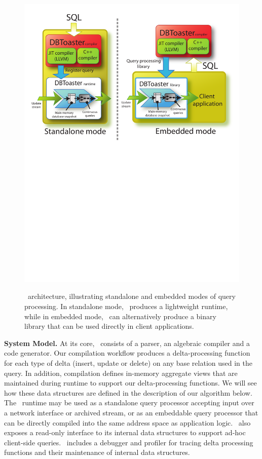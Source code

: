 \begin{figure}[tb]
\includegraphics[scale=0.42]{figures/dbt-arch.pdf}
\label{fig:dbtarch}

\vspace{-6mm}

\caption{\compiler\ architecture, illustrating standalone and embedded modes of
query processing. In standalone mode, \compiler\ produces a lightweight
runtime, while in embedded mode, \compiler\ can alternatively produce a binary
library that can be used directly in client applications.}

\vspace{-4mm}

\end{figure}

\noindent\textbf{System Model.}
At its core, \compiler\ consists of a parser, an algebraic compiler and a code
generator. Our compilation workflow produces a delta-processing function for each
type of delta (insert, update or delete) on any base relation used in the query.
In addition, compilation defines in-memory aggregate views that are maintained
during runtime to support our delta-processing functions. We will see how these
data structures are defined in the description of our algorithm below. The
\compiler\ runtime may be used as a standalone query processor accepting input
over a network interface or archived stream, or as an embeddable query processor
that can be directly compiled into the same address space as application logic.
\compiler\ also exposes a read-only interface to its internal data structures to
support ad-hoc client-side queries. \compiler\ includes a debugger and profiler
for tracing delta processing functions and their maintenance of internal data
structures.

